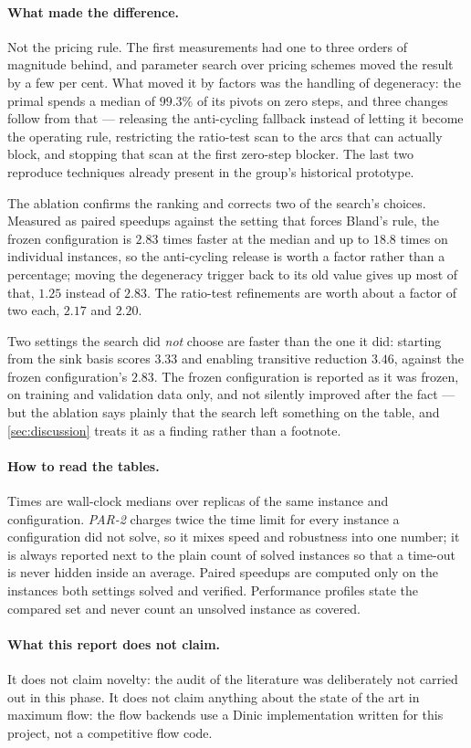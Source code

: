 \paragraph{What made the difference.} Not the pricing rule. The first
measurements had \FS{} one to three orders of magnitude behind, and parameter
search over pricing schemes moved the result by a few per cent. What moved it by
factors was the handling of degeneracy: the primal spends a median of $99.3\%$
of its pivots on zero steps, and three changes follow from that ---
releasing the anti-cycling fallback instead of letting it become the operating
rule, restricting the ratio-test scan to the arcs that can actually block, and
stopping that scan at the first zero-step blocker. The last two reproduce
techniques already present in the group's historical prototype.

The ablation confirms the ranking and corrects two of the search's choices.
Measured as paired speedups against the setting that forces Bland's rule,
the frozen configuration is $2.83$ times faster at the median and up to $18.8$
times on individual instances, so the anti-cycling release is worth a factor
rather than a percentage; moving the degeneracy trigger back to its old value
gives up most of that, $1.25$ instead of $2.83$. The ratio-test refinements are
worth about a factor of two each, $2.17$ and $2.20$.

Two settings the search did \emph{not} choose are faster than the one it did:
starting from the sink basis scores $3.33$ and enabling transitive reduction
$3.46$, against the frozen configuration's $2.83$. The frozen configuration is
reported as it was frozen, on training and validation data only, and not
silently improved after the fact --- but the ablation says plainly that the
search left something on the table, and \cref{sec:discussion} treats it as a
finding rather than a footnote.

\paragraph{How to read the tables.} Times are wall-clock medians over replicas of
the same instance and configuration. \emph{PAR-2} charges twice the time limit
for every instance a configuration did not solve, so it mixes speed and
robustness into one number; it is always reported next to the plain count of
solved instances so that a time-out is never hidden inside an average. Paired
speedups are computed only on the instances both settings solved and verified.
Performance profiles state the compared set and never count an unsolved instance
as covered.

\paragraph{What this report does not claim.} It does not claim novelty: the
audit of the literature was deliberately not carried out in this phase. It does
not claim anything about the state of the art in maximum flow: the flow backends
use a Dinic implementation written for this project, not a competitive flow code.

